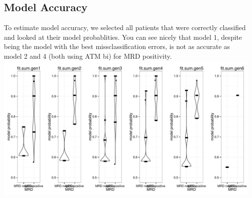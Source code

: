 \documentclass[a4paper,11pt]{article}
\begin{document}
\subsection{Model Accuracy}
To estimate model accuracy, we selected all patients that were correctly classified and looked at their model probablities. You can see nicely that model 1, despite being the model with the best missclassification errors, is not as accurate as model 2 and 4 (both using ATM bi) for MRD positivity. \\
\includegraphics{HICF1_Finalreportv6-022}
\end{document}
